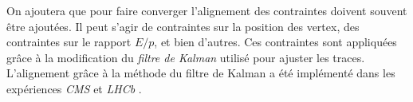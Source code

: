 \begin{appendices}
   On ajoutera que pour faire converger l'alignement des contraintes doivent souvent \^etre ajout\'ees. Il peut s'agir de contraintes sur la position des vertex, des contraintes sur le rapport $E/p$, et bien d'autres. Ces contraintes sont appliqu\'ees gr\^ace \`a la modification du \textit{filtre de Kalman} utilis\'e pour ajuster les traces. L'alignement grâce \`a la m\'ethode du filtre de Kalman a \'et\'e impl\'ement\'e dans les exp\'eriences \textit{CMS} \cite{Sprenger:2010ss} et \textit{LHCb} \cite{Amoraal:1346053}.
%  
% 
%    
%    
%    

\end{appendices}
